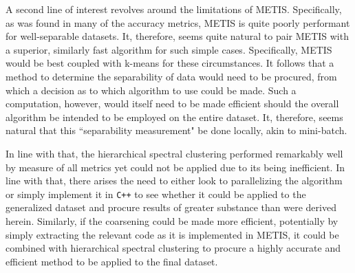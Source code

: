 \documentclass{article}
\begin{document}
A second line of interest revolves around the limitations of METIS. Specifically, as was found in many of the accuracy metrics, METIS is quite poorly performant for well-separable datasets. It, therefore, seems quite natural to pair METIS with a superior, similarly fast algorithm for such simple cases. Specifically, METIS would be best coupled with k-means for these circumstances. It follows that a method to determine the separability of data would need to be procured, from which a decision as to which algorithm to use could be made. Such a computation, however, would itself need to be made efficient should the overall algorithm be intended to be employed on the entire dataset. It, therefore, seems natural that this ``separability measurement" be done locally, akin to mini-batch.

In line with that, the hierarchical spectral clustering performed remarkably well by measure of all metrics yet could not be applied due to its being inefficient. In line with that, there arises the need to either look to parallelizing the algorithm or simply implement it in \texttt{C++} to see whether it could be applied to the generalized dataset and procure results of greater substance than were derived herein. Similarly, if the coarsening could be made more efficient, potentially by simply extracting the relevant code as it is implemented in METIS, it could be combined with hierarchical spectral clustering to procure a highly accurate and efficient method to be applied to the final dataset.
\end{document}
